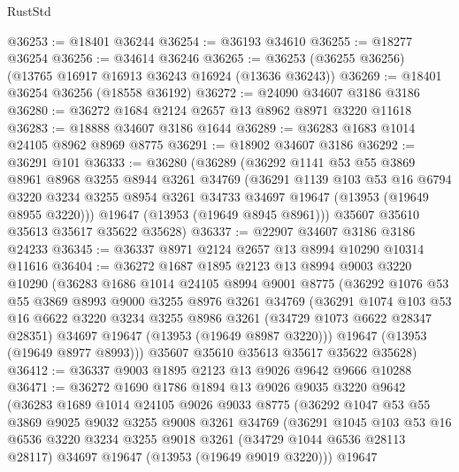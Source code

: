 \begin{lexlean}{RustStd}
\begin{coremodule}
@36253 := @18401 @36244
@36254 := @36193 @34610
@36255 := @18277 @36254
@36256 := @34614 @36246
@36265 := @36253 (@36255 @36256) (@13765 @16917 @16913 @36243 @16924 (@13636 @36243))
@36269 := @18401 @36254 @36256 (@18558 @36192)
@36272 := @24090 @34607 @3186 @3186
@36280 := @36272 @1684 @2124 @2657 @13 @8962 @8971 @3220 @11618
@36283 := @18888 @34607 @3186 @1644
@36289 := @36283 @1683 @1014 @24105 @8962 @8969 @8775
@36291 := @18902 @34607 @3186
@36292 := @36291 @101
@36333 := @36280
    (@36289
      (@36292
        @1141
        @53
        @55
        @3869
        @8961
        @8968
        @3255
        @8944
        @3261
        @34769
        (@36291
          @1139
          @103
          @53
          @16
          @6794
          @3220
          @3234
          @3255
          @8954
          @3261
          @34733
          @34697
          @19647
          (@13953 (@19649 @8955 @3220)))
        @19647
        (@13953 (@19649 @8945 @8961)))
      @35607
      @35610
      @35613
      @35617
      @35622
      @35628)
@36337 := @22907 @34607 @3186 @3186 @24233
@36345 := @36337 @8971 @2124 @2657 @13 @8994 @10290 @10314 @11616
@36404 := @36272
    @1687
    @1895
    @2123
    @13
    @8994
    @9003
    @3220
    @10290
    (@36283
      @1686
      @1014
      @24105
      @8994
      @9001
      @8775
      (@36292
        @1076
        @53
        @55
        @3869
        @8993
        @9000
        @3255
        @8976
        @3261
        @34769
        (@36291
          @1074
          @103
          @53
          @16
          @6622
          @3220
          @3234
          @3255
          @8986
          @3261
          (@34729 @1073 @6622 @28347 @28351)
          @34697
          @19647
          (@13953 (@19649 @8987 @3220)))
        @19647
        (@13953 (@19649 @8977 @8993)))
      @35607
      @35610
      @35613
      @35617
      @35622
      @35628)
@36412 := @36337 @9003 @1895 @2123 @13 @9026 @9642 @9666 @10288
@36471 := @36272
    @1690
    @1786
    @1894
    @13
    @9026
    @9035
    @3220
    @9642
    (@36283
      @1689
      @1014
      @24105
      @9026
      @9033
      @8775
      (@36292
        @1047
        @53
        @55
        @3869
        @9025
        @9032
        @3255
        @9008
        @3261
        @34769
        (@36291
          @1045
          @103
          @53
          @16
          @6536
          @3220
          @3234
          @3255
          @9018
          @3261
          (@34729 @1044 @6536 @28113 @28117)
          @34697
          @19647
          (@13953 (@19649 @9019 @3220)))
        @19647

\end{coremodule}
\end{lexlean}
